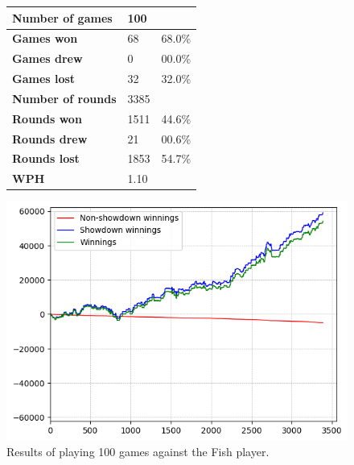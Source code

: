\begin{figure}[H]
    \centering
    \begin{minipage}{\textwidth}
        \begin{minipage}{0.40\textwidth}
            \begin{tabular}{|l|l|l|}
                \hline
                \textbf{Number of games}  & 100  &        \\ \hline
                \textbf{Games won}        & 68   & 68.0\% \\ \hline
                \textbf{Games drew}       & 0    & 00.0\%  \\ \hline
                \textbf{Games lost}       & 32   & 32.0\% \\ \hline
                \textbf{Number of rounds} & 3385 &        \\ \hline
                \textbf{Rounds won}       & 1511 & 44.6\% \\ \hline
                \textbf{Rounds drew}      & 21   & 00.6\%  \\ \hline
                \textbf{Rounds lost}      & 1853 & 54.7\% \\ \hline
                \textbf{WPH}              & 1.10 &        \\ \hline
            \end{tabular}
        \end{minipage}
        \hspace{0.05\textwidth}
        \begin{minipage}{0.5\textwidth}
            \includegraphics[width=\textwidth]{graphics/fish.png}
        \end{minipage}
    \end{minipage}
    \caption{Results of playing 100 games against the Fish player.}
    \label{fig:results_fish}
\end{figure}


